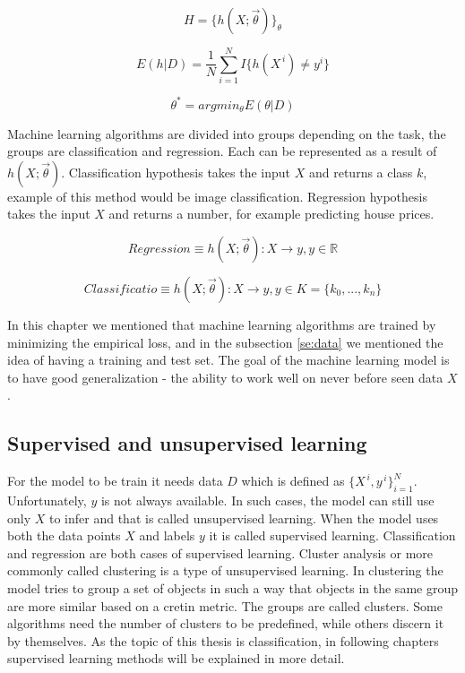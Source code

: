 \documentclass[times, utf8, diplomski]{fer}
\begin{document}
\begin{equation} \label{eq:model}
	H = \{ h(X ; \vec{\theta}) \}_{\theta}
\end{equation}

\begin{equation} \label{eq:error_function}
	E(h|D) =  \frac{1}{N} \displaystyle\sum_{i=1}^{N} I\{h(X^{\,i}) \neq y^{i}\}
\end{equation}

\begin{equation} \label{eq:optimization_function}
	\theta^{*} = argmin_{\theta} E(\theta | D)
\end{equation}


Machine learning algorithms are divided into groups depending on the task, the groups are classification and regression. Each can be represented as a result of $h(X ; \vec{\theta})$. Classification hypothesis takes the input $X$ and returns a class $k$, example of this method would be image classification. Regression hypothesis takes the input $X$ and returns a number, for example predicting house prices.

\begin{equation} \label{eq:accuracy}
	Regression \equiv h(X ; \vec{\theta}) : X \to y, y \in \mathbb{R}
\end{equation}

\begin{equation} \label{eq:precision}
	Classificatio  \equiv h(X ; \vec{\theta}) : X \to y, y \in K = \{k_{0}, ..., k_{n}\}
\end{equation}

In this chapter we mentioned that machine learning algorithms are trained by minimizing the empirical loss, and in the subsection \ref{se:data} we mentioned the idea of having a training and test set. The goal of the machine learning model is to have good generalization - the ability to work well on never before seen data $X$.


\subsection{Supervised and unsupervised learning}
For the model to be train it needs data $D$ which is defined as $\{{X}^{\,i},y^{\,i}\}^{N}_{i=1}$. Unfortunately, $y$ is not always available. In such cases, the model can still use only $X$ to infer and that is called unsupervised learning. When the model uses both the data points $X$ and labels $y$ it is called supervised learning. Classification and regression are both cases of supervised learning. Cluster analysis or more commonly called clustering is a type of unsupervised learning. In clustering the model tries to group a set of objects in such a way that objects in the same group are more similar based on a cretin metric. The groups are called clusters. Some algorithms need the number of clusters to be predefined, while others discern it by themselves. As the topic of this thesis is classification, in following chapters supervised learning methods will be explained in more detail.
\end{document}
